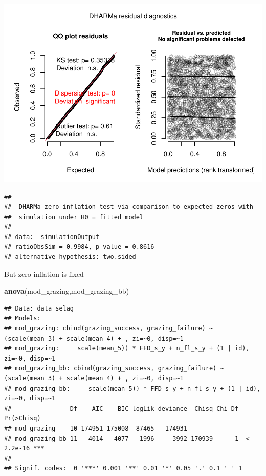 \documentclass[
]{article}
\newenvironment{Shaded}{\begin{snugshade}}{\end{snugshade}}
\newcommand{\KeywordTok}[1]{\textcolor[rgb]{0.13,0.29,0.53}{\textbf{#1}}}
\newcommand{\NormalTok}[1]{#1}
\begin{document}
\includegraphics{lathyrus_ms3_3_after_rev_Ecology_files/figure-latex/unnamed-chunk-35-1.pdf}

\begin{verbatim}
## 
##  DHARMa zero-inflation test via comparison to expected zeros with
##  simulation under H0 = fitted model
## 
## data:  simulationOutput
## ratioObsSim = 0.9984, p-value = 0.8616
## alternative hypothesis: two.sided
\end{verbatim}

But zero inflation is fixed

\begin{Shaded}
\begin{Highlighting}[]
\KeywordTok{anova}\NormalTok{(mod\_grazing,mod\_grazing\_bb)}
\end{Highlighting}
\end{Shaded}

\begin{verbatim}
## Data: data_selag
## Models:
## mod_grazing: cbind(grazing_success, grazing_failure) ~ (scale(mean_3) + scale(mean_4) + , zi=~0, disp=~1
## mod_grazing:     scale(mean_5)) * FFD_s_y + n_fl_s_y + (1 | id), zi=~0, disp=~1
## mod_grazing_bb: cbind(grazing_success, grazing_failure) ~ (scale(mean_3) + scale(mean_4) + , zi=~0, disp=~1
## mod_grazing_bb:     scale(mean_5)) * FFD_s_y + n_fl_s_y + (1 | id), zi=~0, disp=~1
##                Df    AIC    BIC logLik deviance  Chisq Chi Df Pr(>Chisq)    
## mod_grazing    10 174951 175008 -87465   174931                             
## mod_grazing_bb 11   4014   4077  -1996     3992 170939      1  < 2.2e-16 ***
## ---
## Signif. codes:  0 '***' 0.001 '**' 0.01 '*' 0.05 '.' 0.1 ' ' 1
\end{verbatim}
\end{document}
